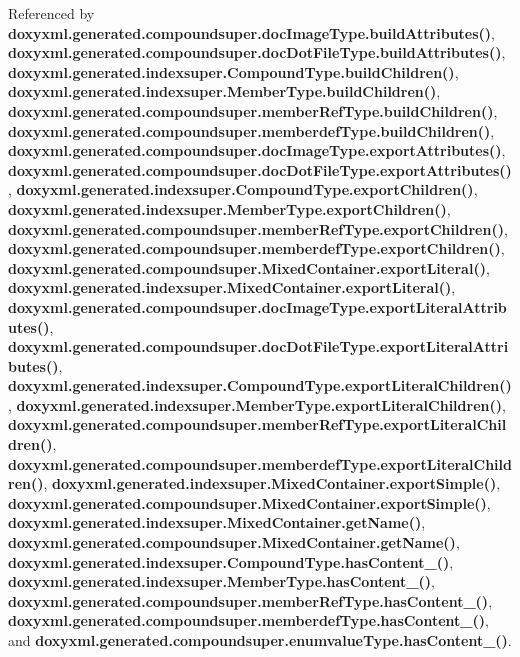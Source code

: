 Referenced by {\bf doxyxml.\+generated.\+compoundsuper.\+doc\+Image\+Type.\+build\+Attributes()}, {\bf doxyxml.\+generated.\+compoundsuper.\+doc\+Dot\+File\+Type.\+build\+Attributes()}, {\bf doxyxml.\+generated.\+indexsuper.\+Compound\+Type.\+build\+Children()}, {\bf doxyxml.\+generated.\+indexsuper.\+Member\+Type.\+build\+Children()}, {\bf doxyxml.\+generated.\+compoundsuper.\+member\+Ref\+Type.\+build\+Children()}, {\bf doxyxml.\+generated.\+compoundsuper.\+memberdef\+Type.\+build\+Children()}, {\bf doxyxml.\+generated.\+compoundsuper.\+doc\+Image\+Type.\+export\+Attributes()}, {\bf doxyxml.\+generated.\+compoundsuper.\+doc\+Dot\+File\+Type.\+export\+Attributes()}, {\bf doxyxml.\+generated.\+indexsuper.\+Compound\+Type.\+export\+Children()}, {\bf doxyxml.\+generated.\+indexsuper.\+Member\+Type.\+export\+Children()}, {\bf doxyxml.\+generated.\+compoundsuper.\+member\+Ref\+Type.\+export\+Children()}, {\bf doxyxml.\+generated.\+compoundsuper.\+memberdef\+Type.\+export\+Children()}, {\bf doxyxml.\+generated.\+compoundsuper.\+Mixed\+Container.\+export\+Literal()}, {\bf doxyxml.\+generated.\+indexsuper.\+Mixed\+Container.\+export\+Literal()}, {\bf doxyxml.\+generated.\+compoundsuper.\+doc\+Image\+Type.\+export\+Literal\+Attributes()}, {\bf doxyxml.\+generated.\+compoundsuper.\+doc\+Dot\+File\+Type.\+export\+Literal\+Attributes()}, {\bf doxyxml.\+generated.\+indexsuper.\+Compound\+Type.\+export\+Literal\+Children()}, {\bf doxyxml.\+generated.\+indexsuper.\+Member\+Type.\+export\+Literal\+Children()}, {\bf doxyxml.\+generated.\+compoundsuper.\+member\+Ref\+Type.\+export\+Literal\+Children()}, {\bf doxyxml.\+generated.\+compoundsuper.\+memberdef\+Type.\+export\+Literal\+Children()}, {\bf doxyxml.\+generated.\+indexsuper.\+Mixed\+Container.\+export\+Simple()}, {\bf doxyxml.\+generated.\+compoundsuper.\+Mixed\+Container.\+export\+Simple()}, {\bf doxyxml.\+generated.\+indexsuper.\+Mixed\+Container.\+get\+Name()}, {\bf doxyxml.\+generated.\+compoundsuper.\+Mixed\+Container.\+get\+Name()}, {\bf doxyxml.\+generated.\+indexsuper.\+Compound\+Type.\+has\+Content\+\_\+()}, {\bf doxyxml.\+generated.\+indexsuper.\+Member\+Type.\+has\+Content\+\_\+()}, {\bf doxyxml.\+generated.\+compoundsuper.\+member\+Ref\+Type.\+has\+Content\+\_\+()}, {\bf doxyxml.\+generated.\+compoundsuper.\+memberdef\+Type.\+has\+Content\+\_\+()}, and {\bf doxyxml.\+generated.\+compoundsuper.\+enumvalue\+Type.\+has\+Content\+\_\+()}.

